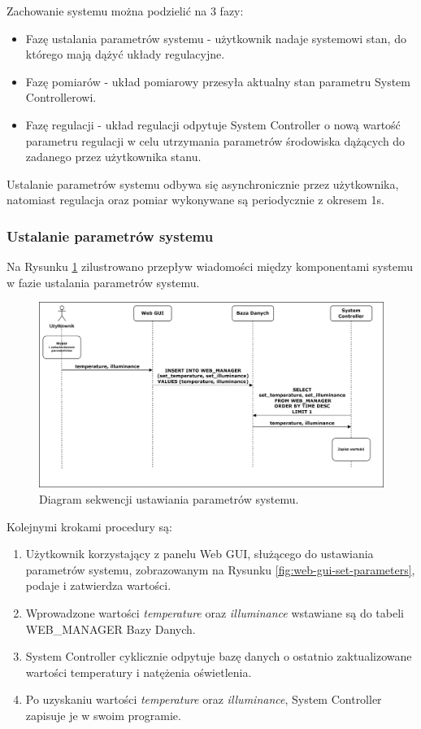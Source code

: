     Zachowanie systemu można podzielić na 3 fazy:
    \begin{itemize}
        \item Fazę ustalania parametrów systemu - użytkownik nadaje systemowi stan, do którego mają dążyć układy regulacyjne.
        \item Fazę pomiarów - układ pomiarowy przesyła aktualny stan parametru System Controllerowi.
        \item Fazę regulacji - układ regulacji odpytuje System Controller o nową wartość parametru regulacji w celu utrzymania parametrów środowiska dążących do zadanego przez użytkownika stanu.
    \end{itemize}

    Ustalanie parametrów systemu odbywa się asynchronicznie przez użytkownika, natomiast regulacja oraz pomiar wykonywane są periodycznie z okresem 1s.

        \subsubsection{Ustalanie parametrów systemu}

            Na Rysunku \ref{fig:seq-user-webgui-db} zilustrowano przepływ wiadomości między komponentami systemu w fazie ustalania parametrów systemu.

            \begin{figure}[H]
                \centering
                \includegraphics[width=0.8\linewidth]{graphics/sequence-diagrams/user-webgui-db-diagram.png}
                \caption{Diagram sekwencji ustawiania parametrów systemu.}
                \label{fig:seq-user-webgui-db}
            \end{figure}

            Kolejnymi krokami procedury są:
            \begin{enumerate}
                \item Użytkownik korzystający z panelu Web GUI, służącego do ustawiania parametrów systemu, zobrazowanym na Rysunku \ref{fig:web-gui-set-parameters}, podaje i zatwierdza wartości.
                \item Wprowadzone wartości \textit{temperature} oraz \textit{illuminance} wstawiane są do tabeli WEB\_MANAGER Bazy Danych.
                \item System Controller cyklicznie odpytuje bazę danych o ostatnio zaktualizowane wartości temperatury i natężenia oświetlenia.
                \item Po uzyskaniu wartości \textit{temperature} oraz \textit{illuminance}, System Controller zapisuje je w swoim programie.
            \end{enumerate}

